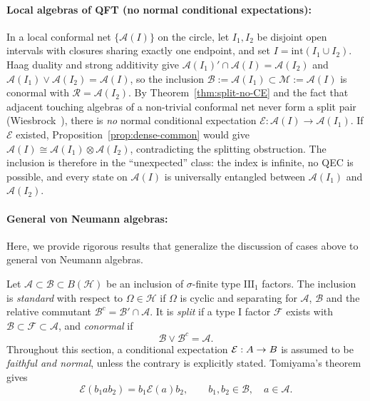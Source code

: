 \documentclass[a4paper,11pt]{article}
\theoremstyle{definition}
\newcommand{\mA}{\mathcal{A}}
\newcommand{\mB}{\mathcal{B}}
\newcommand{\mE}{\mathcal{E}}
\begin{document}
\paragraph{Local algebras of QFT (no normal conditional expectations):}
In a local conformal net $\{\mathcal{A}(I)\}$ on the circle, let $I_1,I_2$ be disjoint
open intervals with closures sharing exactly one endpoint, and set $I=\mathrm{int}(I_1\cup I_2)$.
Haag duality and strong additivity give $\mathcal{A}(I_1)'\cap\mathcal{A}(I)=\mathcal{A}(I_2)$
and $\mathcal{A}(I_1)\vee\mathcal{A}(I_2)=\mathcal{A}(I)$, so the inclusion
$\mathcal{B}:=\mathcal{A}(I_1)\subset\mathcal{M}:=\mathcal{A}(I)$ is conormal with
$\mathcal{R}=\mathcal{A}(I_2)$.  By Theorem~\ref{thm:split-no-CE} and the fact that
adjacent touching algebras of a non-trivial conformal net never form a split pair
(Wiesbrock~\cite{Wiesbrock1993}), there is \emph{no} normal conditional expectation
$\mE:\mathcal{A}(I)\to\mathcal{A}(I_1)$.  If $\mE$ existed, Proposition~\ref{prop:dense-common}
would give $\mathcal{A}(I)\cong\mathcal{A}(I_1)\otimes\mathcal{A}(I_2)$, contradicting the
splitting obstruction.  The inclusion is therefore in the ``unexpected'' class: the index
is infinite, no QEC is possible, and every state on $\mathcal{A}(I)$ is universally
entangled between $\mathcal{A}(I_1)$ and $\mathcal{A}(I_2)$.


\paragraph{General von Neumann algebras:}
\label{sec:conormality-expectations} Here, we provide rigorous results that generalize the discussion of cases above to general von Neumann algebras.

Let $\mA\subset\mB\subset B(\mathcal H)$ be an inclusion of
$\sigma$-finite type $\mathrm{III}_1$ factors.  The inclusion is
\emph{standard} with respect to $\Omega\in\mathcal H$ if $\Omega$ is cyclic
and separating for $\mA$, $\mB$ and the relative commutant $\mB^c=\mB'\cap \mA$. It is \emph{split} if a type I factor $\mathcal F$ exists with
$\mB\subset\mathcal F\subset\mA$, and \emph{conormal} if
\begin{equation}
 \mB\vee\mB^c=\mA.
\end{equation}
Throughout this section, a conditional expectation
$\mE:\mathcal \mA\to\mathcal \mB$ is assumed to be \emph{faithful and normal},
unless the contrary is explicitly stated.  Tomiyama's theorem \cite{Tomiyama1957,Tomiyama1959,Takesaki1972} gives
\begin{equation}
 \mE(b_1 a b_2)=b_1\mE(a) b_2,
 \qquad b_1,b_2\in \mB,\quad a\in \mA.
\end{equation}
\end{document}
